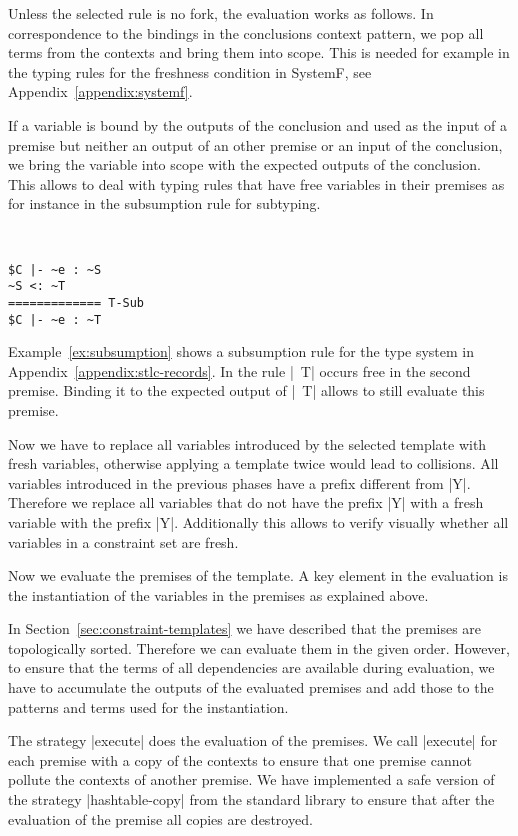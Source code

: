 Unless the selected rule is no fork, the evaluation works as
follows. In correspondence to the bindings in the conclusions context
pattern, we pop all terms from the contexts and bring them into
scope. This is needed for example in the typing rules for the
freshness condition in SystemF, see
Appendix~\ref{appendix:systemf}. 

If a variable is bound by the outputs of the conclusion and used as
the input of a premise but neither an output of an other premise or an
input of the conclusion, we bring the variable into scope with the
expected outputs of the conclusion. This allows to deal with typing
rules that have free variables in their premises as for instance in
the subsumption rule for subtyping.

\begin{example}{~}
\begin{lstlisting}[language=sltc]
$C |- ~e : ~S
~S <: ~T
============= T-Sub
$C |- ~e : ~T
\end{lstlisting}
\label{ex:subsumption}
\end{example}

Example~\ref{ex:subsumption} shows a subsumption rule for the type
system in Appendix~\ref{appendix:stlc-records}. In the rule \code|~T|
occurs free in the second premise. Binding it to the expected output
of \code|~T| allows to still evaluate this premise.

Now we have to replace all variables introduced by the selected
template with fresh variables, otherwise applying a template twice
would lead to collisions. All variables introduced in the previous
phases have a prefix different from \code|Y|. Therefore we replace all
variables that do not have the prefix \code|Y| with a fresh variable
with the prefix \code|Y|. Additionally this allows to verify visually
whether all variables in a constraint set are fresh.

Now we evaluate the premises of the template. A key element in the
evaluation is the instantiation of the variables in the premises as
explained above.

In Section~\ref{sec:constraint-templates} we have described that the
premises are topologically sorted. Therefore we can evaluate them in
the given order. However, to ensure that the terms of all dependencies
are available during evaluation, we have to accumulate the outputs of
the evaluated premises and add those to the patterns and terms used
for the instantiation.

The strategy \code|execute| does the evaluation of the premises. We
call \code|execute| for each premise with a copy of the contexts to
ensure that one premise cannot pollute the contexts of another
premise. We have implemented a safe version of the strategy
\code|hashtable-copy| from the standard library to ensure that after
the evaluation of the premise all copies are destroyed.

